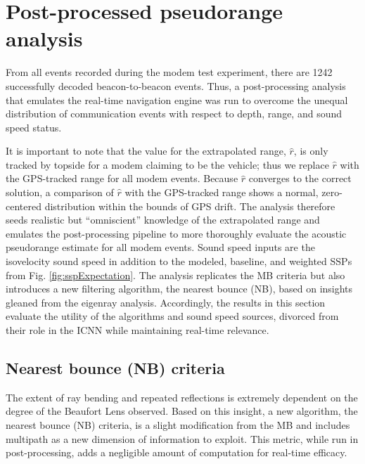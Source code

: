 \clearpage
\section{\label{sec:post} Post-processed pseudorange analysis}

From all events recorded during the modem test experiment, there are 1242 successfully decoded beacon-to-beacon events.
Thus, a post-processing analysis that emulates the real-time navigation engine was run to overcome the unequal distribution of communication events with respect to depth, range, and sound speed status.

It is important to note that the value for the extrapolated range, $\hat{r}$, is only tracked by topside for a modem claiming to be the vehicle; thus we replace $\hat{r}$ with the GPS-tracked range for all modem events.
Because $\hat{r}$ converges to the correct solution, a comparison of $\hat{r}$ with the GPS-tracked range shows a normal, zero-centered distribution within the bounds of GPS drift.
The analysis therefore seeds realistic but ``omniscient'' knowledge of the extrapolated range and emulates the post-processing pipeline to more thoroughly evaluate the acoustic pseudorange estimate for all modem events.
Sound speed inputs are the isovelocity sound speed in addition to the modeled, baseline, and weighted SSPs from Fig. \ref{fig:sspExpectation}.
The analysis replicates the MB criteria but also introduces a new filtering algorithm, the nearest bounce (NB), based on insights gleaned from the eigenray analysis.
Accordingly, the results in this section evaluate the utility of the algorithms and sound speed sources, divorced from their role in the ICNN while maintaining real-time relevance.

\subsection{Nearest bounce (NB) criteria}

 The extent of ray bending and repeated reflections is extremely dependent on the degree of the Beaufort Lens observed.
Based on this insight, a new algorithm, the nearest bounce (NB) criteria, is a slight modification from the MB and includes multipath as a new dimension of information to exploit.
This metric, while run in post-processing, adds a negligible amount of computation for real-time efficacy.

